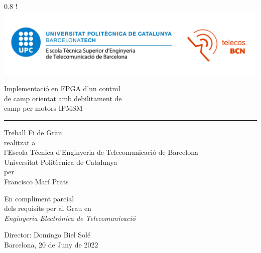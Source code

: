 \documentclass[a4paper,12pt]{article}
\begin{document}

{
    \fancyhf{}\renewcommand{\headrulewidth}{0pt}
}

\thispagestyle{empty}

\begin{center} {
    \sffamily 
    \resizebox
        {0.8\textwidth}
        {!}
        {\includegraphics{img/0_logos/upc_completo+telecos.png}}\\
    \vspace{1cm}

    {
        \Huge 
        {
            Implementació en FPGA d’un control \\ 
            de camp orientat amb debilitament de \\ 
            camp per motors IPMSM \\
        }
    }
    \vspace{0.75cm} 
    \hrule \color{black}
    \vspace{1cm}

    \large 
    {
        Treball Fi de Grau \\
        realitzat a \\
        l'Escola Tècnica d'Enginyeria de Telecomunicació de Barcelona \\
        Universitat Politècnica de Catalunya \\
        per \\
        \vspace{0.5cm}
        Francisco Marí Prats
    }
    \vspace{1.5cm}

    {
        En compliment parcial \\ 
        dels requisits per al Grau en \\
        \textit{Enginyeria Electrònica de Telecomunicació}
    }
    \vspace{2cm}

    {
        Director: Domingo Biel Solé \\
        Barcelona, 20 de Juny de 2022
    }
}
\end{center}
\end{document}
